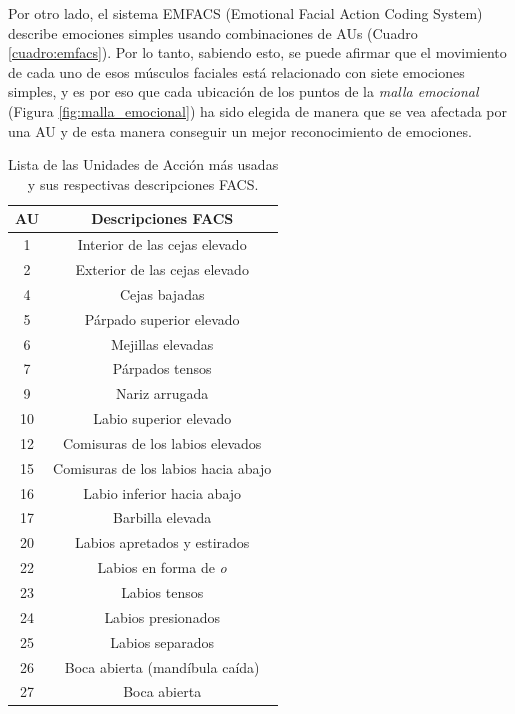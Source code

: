 Por otro lado, el sistema EMFACS (Emotional Facial Action Coding System) describe emociones simples usando combinaciones de AUs (Cuadro \ref{cuadro:emfacs}). Por lo tanto, sabiendo esto, se puede afirmar que el movimiento de cada uno de esos músculos faciales está relacionado con siete emociones simples, y es por eso que cada ubicación de los puntos de la \textit{malla emocional} (Figura \ref{fig:malla_emocional}) ha sido elegida de manera que se vea afectada por una AU y de esta manera conseguir un mejor reconocimiento de emociones.\\

\begin{table}[H]
\begin{center}
\begin{tabular}{|c|c|}
     \hline
    \textbf{AU} & \textbf{Descripciones FACS} \\
    \hline
     1 & Interior de las cejas elevado\\ 
     2 & Exterior de las cejas elevado \\ 
     4 & Cejas bajadas \\
     5 & Párpado superior elevado\\
     6 & Mejillas elevadas \\ 
     7 & Párpados tensos \\
     9 & Nariz arrugada \\
     10 & Labio superior elevado \\
     12 & Comisuras de los labios elevados \\ 
     15 & Comisuras de los labios hacia abajo \\
     16 & Labio inferior hacia abajo \\
     17 & Barbilla elevada \\
     20 & Labios apretados y estirados\\
     22 & Labios en forma de \textit{o} \\
     23 & Labios tensos \\
     24 & Labios presionados \\
     25 & Labios separados \\
     26 & Boca abierta (mandíbula caída)\\
     27 & Boca abierta \\
     \hline
 \end{tabular}
 \captionsetup{justification=centering}
\caption{Lista de las Unidades de Acción más usadas y sus respectivas descripciones FACS.}
\label{cuadro:au}
\end{center}
\end{table}

